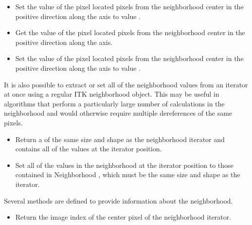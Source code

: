 {\begin{itemize}
\item \textbf{}
Set the value of the pixel located  pixels from the neighborhood center
in the positive direction along the  axis to value .

\item \textbf{} Get the value of the pixel located  pixels from the
neighborhood center in the positive direction along the  axis.
 
\item \textbf{} Set the value of the pixel located  pixels from
the neighborhood center in the positive direction along the 
axis to value .

\end{itemize}

It is also possible to extract or set all of the neighborhood values
from an iterator at once using a regular ITK neighborhood object.
This may be useful in algorithms that perform a particularly large
number of calculations in the neighborhood and would otherwise require
multiple dereferences of the same pixels.

\begin{itemize}

\item \textbf{} Return a
 of the same size and shape as the neighborhood
iterator and contains all of the values at the iterator position.

\item \textbf{} Set all
of the values in the neighborhood at the iterator position to those contained
in Neighborhood , which must be the same size and shape as the
iterator.

\end{itemize}

Several methods are defined to provide information about the neighborhood.

\begin{itemize}

\item \textbf{} Return the image
index of the center pixel of the neighborhood iterator.


\end{itemize}}
